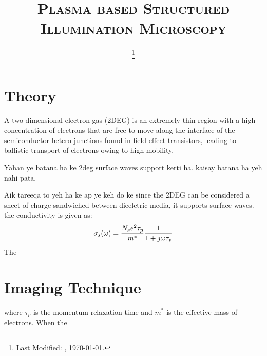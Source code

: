 \documentclass[11pt]{article}
\begin{document}
\title{\textsc{Plasma based Structured Illumination Microscopy}\\}
\date{\footnote{Last Modified: \currenttime, \today.}}
\maketitle

\section{Theory}

A two-dimensional electron gas (2DEG) is an extremely thin region with a high concentration of electrons that are free to move along the interface of the semiconductor hetero-junctions found in field-effect transistors, leading to ballistic transport of electrons owing to high mobility.

Yahan ye batana ha ke 2deg surface waves support kerti ha. kaisay batana ha yeh nahi pata.

Aik tareeqa to yeh ha ke ap ye keh do ke since the 2DEG can be considered a sheet of charge sandwiched between dieelctric media, it supports surface waves. the conductivity is given as:
%
\begin{equation}
  \sigma_s(\omega) = \frac{N_s e^2 \tau_{p}}{m^{\ast}}\frac{1}{1 + j \omega \tau_{p}}
  \label{eq:conductivity}
\end{equation}
%
The
\begin{equation}

\end{equation}

\section{Imaging Technique}


%
where $\tau_p$ is the momentum relaxation time and $m^{\ast}$ is the effective  mass of electrons. When the

\clearpage %


\end{document}
